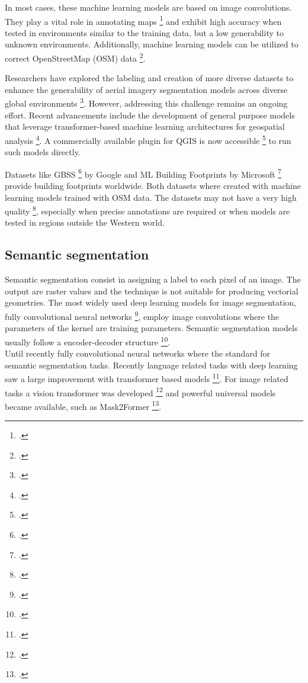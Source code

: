 \begin{refsection}
In most cases, these machine learning models are based on image 
convolutions. They play a vital role in annotating maps 
\footcite{jiao_machine_2018, 
abdurakhmonov_advances_2023} and exhibit high 
accuracy when tested in environments similar to the training data, 
but a low generability to unknown environments. 
Additionally, machine learning models can be utilized to correct 
OpenStreetMap (OSM) data 
\footcite{vargas-munoz_openstreetmap_2021}.


Researchers have explored the labeling and creation of more diverse  
datasets to enhance the generability of aerial imagery 
segmentation models across diverse global environments 
\footcite{maggiori_can_2017}. However, addressing 
this challenge remains an ongoing effort. Recent advancements include 
the development of general purpose models that leverage 
transformer-based machine learning architectures for geospatial 
analysis \footcite{wu_samgeo_2023}. 
A commercially available 
plugin for QGIS is now accessible 
\footcite{aszkowski_deepness_2023} to run such models 
directly.


Datasets like GBSS 
\footcite{hu_gbssglobal_2024} by Google and 
ML Building Footprints by Microsoft 
\footcite{microsoft_globalmlbuildingfootprints_2024} provide 
building footprints worldwide. Both datasets where 
created with machine learning models trained with OSM data. 
The datasets may not have a very high quality  
\footcite{gonzales_building-level_2023}, especially 
when precise annotations are required or when models are tested in 
regions outside the Western world. \\

\subsection{Semantic segmentation}

Semantic segmentation consist in assigning a label to each pixel of an image. The output are raster values and the technique is not suitable for producing vectorial geometries. The most widely used deep learning models for image segmentation,
fully convolutional neural networks \footcite{long_fully_2015},
employ image convolutions where the parameters of the kernel
are training parameters. Semantic segmentation models usually follow a 
encoder-decoder structure \footcite{badrinarayanan_segnet_2016}. \\ 


Until recently fully convolutional neural networks where the standard for
semantic segmentation tasks. Recently language related tasks with deep
learning saw a large improvement with transformer based models
\footcite{vaswani_attention_2023}. For image related tasks a vision transformer
was developed \footcite{dosovitskiy_image_2020} and powerful universal models became available, such as Mask2Former \footcite{cheng_masked-attention_2022}.



\end{refsection}
